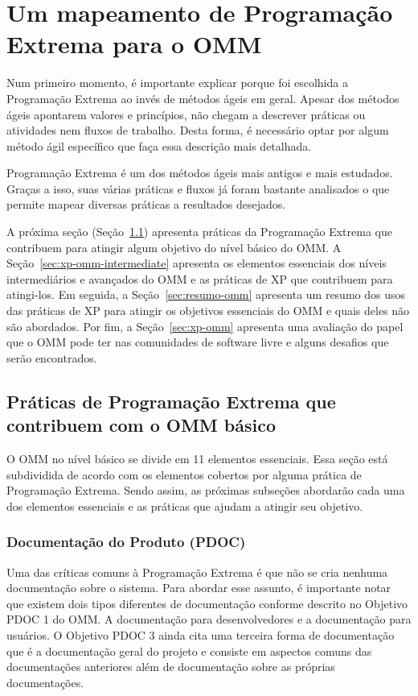 \section{Um mapeamento de Programação Extrema para o OMM}
\label{sec:xp-em-omm}

Num primeiro momento, é importante explicar porque foi escolhida a
Programação Extrema ao invés de métodos ágeis em geral. Apesar dos
métodos ágeis apontarem valores e princípios, não chegam a descrever
práticas ou atividades nem fluxos de trabalho. Desta forma, é
necessário optar por algum método ágil específico que faça essa
descrição mais detalhada.

Programação Extrema é um dos métodos ágeis mais antigos e mais
estudados. Graças a isso, suas várias práticas e fluxos já foram
bastante analisados o que permite mapear diversas práticas a
resultados desejados.

A próxima seção (Seção~\ref{sec:xp+omm}) apresenta práticas da
Programação Extrema que contribuem para atingir algum objetivo do
nível básico do OMM. A Seção~\ref{sec:xp-omm-intermediate} apresenta
os elementos essenciais dos níveis intermediários e avançados do OMM e
as práticas de XP que contribuem para atingi-los.  Em seguida, a
Seção~\ref{sec:resumo-omm} apresenta um resumo dos usos das práticas
de XP para atingir os objetivos essenciais do OMM e quais deles não
são abordados. Por fim, a Seção~\ref{sec:xp-omm} apresenta uma
avaliação do papel que o OMM pode ter nas comunidades de software
livre e alguns desafios que serão encontrados.

\subsection{Práticas de Programação Extrema que contribuem com o OMM
  básico}
\label{sec:xp+omm}

O OMM no nível básico se divide em 11 elementos essenciais. Essa seção
está subdividida de acordo com os elementos cobertos por alguma
prática de Programação Extrema. Sendo assim, as próximas subseções
abordarão cada uma dos elementos essenciais e as práticas que ajudam a
atingir seu objetivo.

\subsubsection{Documentação do Produto (PDOC)}
\label{sec:+pdoc}

Uma das críticas comuns à Programação Extrema é que não se cria
nenhuma documentação sobre o sistema. Para abordar esse assunto, é
importante notar que existem dois tipos diferentes de documentação
conforme descrito no Objetivo PDOC 1 do OMM. A documentação para
desenvolvedores e a documentação para usuários. O Objetivo PDOC 3
ainda cita uma terceira forma de documentação que é a documentação
geral do projeto e consiste em aspectos comuns das documentações
anteriores além de documentação sobre as próprias documentações.

